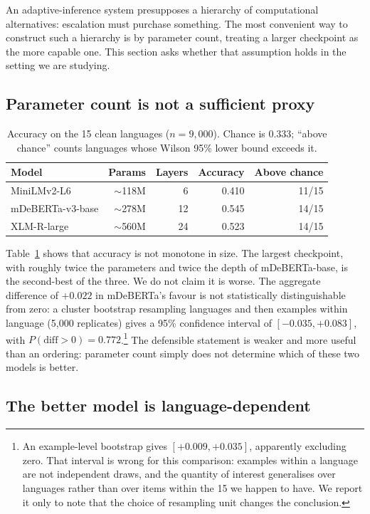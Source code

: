 \documentclass[11pt]{article}
\begin{document}
An adaptive-inference system presupposes a hierarchy of computational
alternatives: escalation must purchase something. The most convenient way to
construct such a hierarchy is by parameter count, treating a larger checkpoint as
the more capable one. This section asks whether that assumption holds in the
setting we are studying.

\subsection{Parameter count is not a sufficient proxy}

\begin{table}[t]
\centering
\small
\begin{tabular}{lrrrr}
\toprule
Model & Params & Layers & Accuracy & Above chance \\
\midrule
MiniLMv2-L6      & $\sim$118M & 6  & 0.410 & 11/15 \\
mDeBERTa-v3-base & $\sim$278M & 12 & 0.545 & 14/15 \\
XLM-R-large      & $\sim$560M & 24 & 0.523 & 14/15 \\
\bottomrule
\end{tabular}
\caption{Accuracy on the 15 clean languages ($n=9{,}000$). Chance is $0.333$;
``above chance'' counts languages whose Wilson 95\% lower bound exceeds it.}
\label{tab:capability}
\end{table}

Table~\ref{tab:capability} shows that accuracy is not monotone in size. The
largest checkpoint, with roughly twice the parameters and twice the depth of
mDeBERTa-base, is the second-best of the three. We do not claim it is worse. The
aggregate difference of $+0.022$ in mDeBERTa's favour is not statistically
distinguishable from zero: a cluster bootstrap resampling languages and then
examples within language (5{,}000 replicates) gives a 95\% confidence interval of
$[-0.035, +0.083]$, with $P(\mathrm{diff} > 0) = 0.772$.\footnote{An
example-level bootstrap gives $[+0.009, +0.035]$, apparently excluding zero. That
interval is wrong for this comparison: examples within a language are not
independent draws, and the quantity of interest generalises over languages rather
than over items within the 15 we happen to have. We report it only to note that
the choice of resampling unit changes the conclusion.} The defensible statement
is weaker and more useful than an ordering: parameter count simply does not
determine which of these two models is better.

\subsection{The better model is language-dependent}
\end{document}
